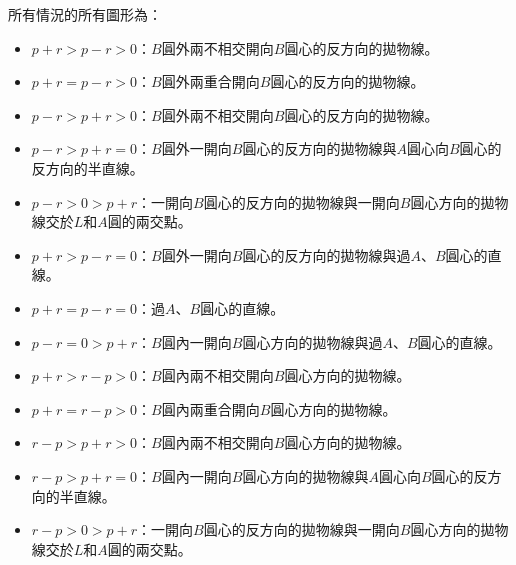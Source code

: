 \documentclass[a4paper,12pt]{article}
\begin{document}
所有情況的所有圖形為：
\begin{itemize}
\item $p+r>p-r>0$：$B$圓外兩不相交開向$B$圓心的反方向的拋物線。
\item $p+r=p-r>0$：$B$圓外兩重合開向$B$圓心的反方向的拋物線。
\item $p-r>p+r>0$：$B$圓外兩不相交開向$B$圓心的反方向的拋物線。
\item $p-r>p+r=0$：$B$圓外一開向$B$圓心的反方向的拋物線與$A$圓心向$B$圓心的反方向的半直線。
\item $p-r>0>p+r$：一開向$B$圓心的反方向的拋物線與一開向$B$圓心方向的拋物線交於$L$和$A$圓的兩交點。
\item $p+r>p-r=0$：$B$圓外一開向$B$圓心的反方向的拋物線與過$A$、$B$圓心的直線。
\item $p+r=p-r=0$：過$A$、$B$圓心的直線。
\item $p-r=0>p+r$：$B$圓內一開向$B$圓心方向的拋物線與過$A$、$B$圓心的直線。
\item $p+r>r-p>0$：$B$圓內兩不相交開向$B$圓心方向的拋物線。
\item $p+r=r-p>0$：$B$圓內兩重合開向$B$圓心方向的拋物線。
\item $r-p>p+r>0$：$B$圓內兩不相交開向$B$圓心方向的拋物線。
\item $r-p>p+r=0$：$B$圓內一開向$B$圓心方向的拋物線與$A$圓心向$B$圓心的反方向的半直線。
\item $r-p>0>p+r$：一開向$B$圓心的反方向的拋物線與一開向$B$圓心方向的拋物線交於$L$和$A$圓的兩交點。
\end{itemize}
\end{document}
